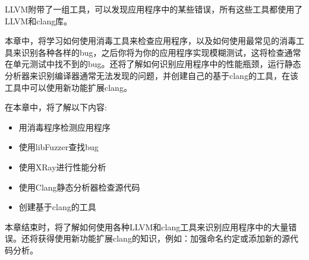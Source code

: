 LLVM附带了一组工具，可以发现应用程序中的某些错误，所有这些工具都使用了LLVM和clang库。

本章中，将学习如何使用消毒工具来检查应用程序，以及如何使用最常见的消毒工具来识别各种各样的bug，之后你将为你的应用程序实现模糊测试，这将检查通常在单元测试中找不到的bug。还将了解如何识别应用程序中的性能瓶颈，运行静态分析器来识别编译器通常无法发现的问题，并创建自己的基于clang的工具，在该工具中可以使用新功能扩展clang。

在本章中，将了解以下内容:

\begin{itemize}
\item
用消毒程序检测应用程序

\item
使用libFuzzer查找bug

\item
使用XRay进行性能分析

\item
使用Clang静态分析器检查源代码

\item
创建基于clang的工具
\end{itemize}

本章结束时，将了解如何使用各种LLVM和clang工具来识别应用程序中的大量错误。还将获得使用新功能扩展clang的知识，例如：加强命名约定或添加新的源代码分析。
